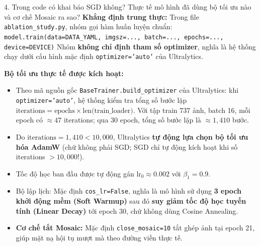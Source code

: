 \documentclass[11pt,a4paper]{article}
\begin{document}
\begin{qbox}{4. Trong code có khai báo SGD không? Thực tế mô hình đã dùng bộ tối ưu nào và cơ chế Mosaic ra sao?}
\textbf{Khẳng định trung thực:} Trong file \texttt{ablation\_study.py}, nhóm gọi hàm huấn luyện chuẩn:
\texttt{model.train(data=DATA\_YAML, imgsz=..., batch=..., epochs=..., device=DEVICE)}
Nhóm \textbf{không chỉ định tham số optimizer}, nghĩa là hệ thống chạy dưới cấu hình mặc định \texttt{optimizer='auto'} của Ultralytics.

\textbf{Bộ tối ưu thực tế được kích hoạt:}
\begin{itemize}[leftmargin=1.5em]
    \item Theo mã nguồn gốc \texttt{BaseTrainer.build\_optimizer} của Ultralytics: khi \texttt{optimizer='auto'}, hệ thống kiểm tra tổng số bước lặp $\text{iterations} = \text{epochs} \times \text{len(train\_loader)}$. Với tập train $737$ ảnh, batch 16, mỗi epoch có $\approx 47$ iterations; qua 30 epoch, tổng số bước lặp là $\approx 1,410$ bước.
    \item Do $\text{iterations} = 1,410 < 10,000$, Ultralytics \textbf{tự động lựa chọn bộ tối ưu hóa AdamW} (chứ không phải SGD; SGD chỉ tự động kích hoạt khi số iterations $> 10,000$!).
    \item Tốc độ học ban đầu được tự động gán $\text{lr}_0 \approx 0.002$ với $\beta_1 = 0.9$.
    \item Bộ lập lịch: Mặc định \texttt{cos\_lr=False}, nghĩa là mô hình sử dụng \textbf{3 epoch khởi động mềm (Soft Warmup)} sau đó \textbf{suy giảm tốc độ học tuyến tính (Linear Decay)} tới epoch 30, chứ không dùng Cosine Annealing.
    \item \textbf{Cơ chế tắt Mosaic:} Mặc định \texttt{close\_mosaic=10} tắt ghép ảnh tại epoch 21, giúp mặt nạ hội tụ mượt mà theo đường viền thực tế.
\end{itemize}
\end{qbox}

\vspace{6pt}
\end{document}

